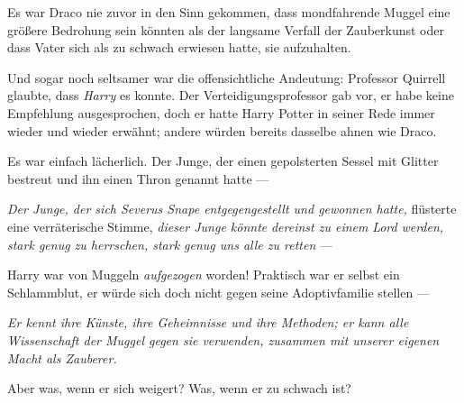 Es war Draco nie zuvor in den Sinn gekommen, dass mondfahrende Muggel eine größere Bedrohung sein könnten als der langsame Verfall der Zauberkunst oder dass Vater sich als zu schwach erwiesen hatte, sie aufzuhalten.

Und sogar noch seltsamer war die offensichtliche Andeutung: Professor Quirrell glaubte, dass \emph{Harry} es konnte. Der Verteidigungsprofessor gab vor, er habe keine Empfehlung ausgesprochen, doch er hatte Harry Potter in seiner Rede immer wieder und wieder erwähnt; andere würden bereits dasselbe ahnen wie Draco.

Es war einfach lächerlich. Der Junge, der einen gepolsterten Sessel mit Glitter bestreut und ihn einen Thron genannt hatte —

\emph{Der Junge, der sich Severus Snape entgegengestellt und gewonnen hatte,} flüsterte eine verräterische Stimme, \emph{dieser Junge könnte} \emph{dereinst zu einem} \emph{Lord} \emph{werden, stark genug zu herrschen, stark genug uns alle zu retten} —

Harry war von Muggeln \emph{aufgezogen} worden! Praktisch war er selbst ein Schlammblut, er würde sich doch nicht gegen seine Adoptivfamilie stellen —

\emph{Er kennt ihre Künste, ihre Geheimnisse und ihre Methoden; er kann alle Wissenschaft der Muggel gegen sie verwenden, zusammen mit unserer eigenen Macht als Zauberer.}

Aber was, wenn er sich weigert? Was, wenn er zu schwach ist?

